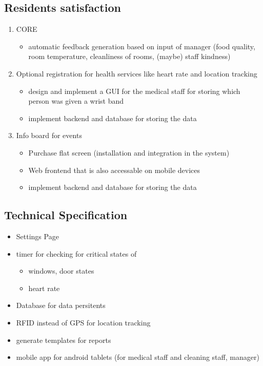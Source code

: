 \subsection{Residents satisfaction}
\label{sec:org903f351}
\begin{enumerate}
\item CORE
\label{sec:orgaf1de29}
\begin{itemize}
\item automatic feedback generation based on input of manager (food quality, room
temperature, cleanliness of rooms, (maybe) staff kindness)
\end{itemize}
\item Optional registration for health services like heart rate and location tracking
\label{sec:org0528d08}
\begin{itemize}
\item design and implement a GUI for the medical staff for storing which person was given a wrist band
\item implement backend and database for storing the data
\end{itemize}
\item Info board for events
\label{sec:orgcba1be4}
\begin{itemize}
\item Purchase flat screen (installation and integration in the system)
\item Web frontend that is also accessable on mobile devices
\item implement backend and database for storing the data
\end{itemize}
\end{enumerate}


\subsection{Technical Specification}
\label{sec:org896d172}
\begin{itemize}
\item Settings Page
\item timer for checking for critical states of
\begin{itemize}
\item windows, door states
\item heart rate
\end{itemize}
\item Database for data persitents
\item RFID instead of GPS for location tracking
\item generate templates for reports
\item mobile app for android tablets (for medical staff and cleaning staff, manager)
\end{itemize}




